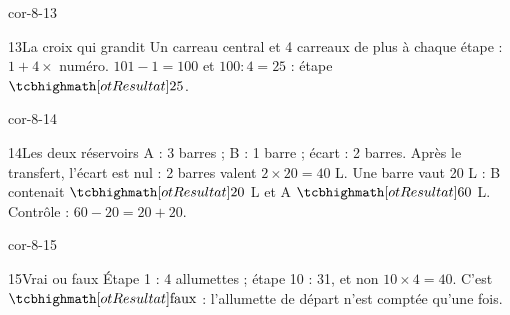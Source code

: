 \begin{blocLivre}{cor-8-13}\begin{corrige}{13}{La croix qui grandit}
Un carreau central et 4 carreaux de plus à chaque étape : $1+4\times$ numéro. $101-1=100$ et $100:4=25$ : étape $\res{25}$.
\label{fig-cor-8-13}
\end{corrige}\end{blocLivre}
\begin{blocLivre}{cor-8-14}\begin{corrige}{14}{Les deux réservoirs}
A : 3 barres ; B : 1 barre ; écart : 2 barres. Après le transfert, l’écart est nul : 2 barres valent $2\times20=40$ L. Une barre vaut 20 L : B contenait $\res{20}$ L et A $\res{60}$ L. Contrôle : $60-20=20+20$.
\end{corrige}\end{blocLivre}
\begin{blocLivre}{cor-8-15}\begin{corrige}{15}{Vrai ou faux}
Étape 1 : 4 allumettes ; étape 10 : 31, et non $10\times4=40$. C’est $\res{\text{faux}}$ : l’allumette de départ n’est comptée qu’une fois.
\end{corrige}\end{blocLivre}
